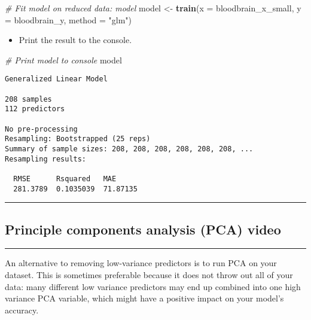 \documentclass[
]{book}
\newenvironment{Shaded}{\begin{snugshade}}{\end{snugshade}}
\newcommand{\CommentTok}[1]{\textcolor[rgb]{0.56,0.35,0.01}{\textit{#1}}}
\newcommand{\DataTypeTok}[1]{\textcolor[rgb]{0.13,0.29,0.53}{#1}}
\newcommand{\KeywordTok}[1]{\textcolor[rgb]{0.13,0.29,0.53}{\textbf{#1}}}
\newcommand{\NormalTok}[1]{#1}
\newcommand{\StringTok}[1]{\textcolor[rgb]{0.31,0.60,0.02}{#1}}
\providecommand{\tightlist}{%
  \setlength{\itemsep}{0pt}\setlength{\parskip}{0pt}}
\begin{document}
\begin{Shaded}
\begin{Highlighting}[]
\CommentTok{# Fit model on reduced data: model}
\NormalTok{model <-}\StringTok{ }\KeywordTok{train}\NormalTok{(}\DataTypeTok{x =}\NormalTok{ bloodbrain_x_small, }\DataTypeTok{y =}\NormalTok{ bloodbrain_y, }\DataTypeTok{method =} \StringTok{"glm"}\NormalTok{)}
\end{Highlighting}
\end{Shaded}

\begin{itemize}
\tightlist
\item
  Print the result to the console.
\end{itemize}

\begin{Shaded}
\begin{Highlighting}[]
\CommentTok{# Print model to console}
\NormalTok{model}
\end{Highlighting}
\end{Shaded}

\begin{verbatim}
Generalized Linear Model 

208 samples
112 predictors

No pre-processing
Resampling: Bootstrapped (25 reps) 
Summary of sample sizes: 208, 208, 208, 208, 208, 208, ... 
Resampling results:

  RMSE      Rsquared   MAE     
  281.3789  0.1035039  71.87135
\end{verbatim}

\begin{center}\rule{0.5\linewidth}{0.5pt}\end{center}

\hypertarget{principle-components-analysis-pca-video}{%
\subsection*{Principle components analysis (PCA) video}\label{principle-components-analysis-pca-video}}

\begin{center}\rule{0.5\linewidth}{0.5pt}\end{center}

An alternative to removing low-variance predictors is to run PCA on your dataset. This is sometimes preferable because it does not throw out all of your data: many different low variance predictors may end up combined into one high variance PCA variable, which might have a positive impact on your model's accuracy.
\end{document}

